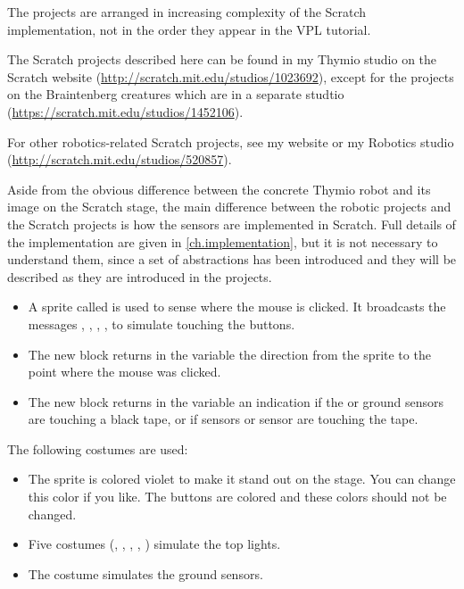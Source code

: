 The projects are arranged in increasing complexity of the Scratch
implementation, not in the order they appear in the VPL tutorial.

The Scratch projects described here can be found in my Thymio studio on
the Scratch website (\url{http://scratch.mit.edu/studios/1023692}),
except for the projects on the Braintenberg creatures which are in a
separate studtio (\url{https://scratch.mit.edu/studios/1452106}).

For other robotics-related Scratch projects, see my website or my
Robotics studio (\url{http://scratch.mit.edu/studios/520857}).


Aside from the obvious difference between the concrete Thymio robot and
its image on the Scratch stage, the main difference between the robotic
projects and the Scratch projects is how the sensors are implemented in
Scratch. Full details of the implementation are given in
\cref{ch.implementation}, but it is not necessary to understand them,
since a set of abstractions has been introduced and they will be
described as they are introduced in the projects.

\begin{itemize}

\item A sprite called  is used to sense where the mouse is
clicked. It broadcasts the messages , , ,
,  to simulate touching the buttons.

\item The new block  returns in the
variable  the direction from the
 sprite to the point where the mouse was clicked.

\item The new block  returns in the variable
 an indication if the  or  ground
sensors are touching a black tape, or if  sensors or 
sensor are touching the tape.

\end{itemize}

The following costumes are used:

\begin{itemize}

\item The  sprite is colored violet to make it stand out on the
stage. You can change this color if you like. The buttons are colored and these
colors should not be changed.

\item Five costumes (, , , ,
) simulate the top lights.

\item The costume  simulates the ground sensors.

\end{itemize}

